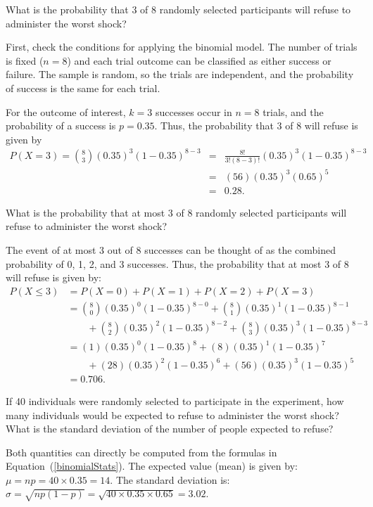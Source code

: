\begin{examplewrap}
\begin{nexample}{What is the probability that 3 of 8 randomly selected participants will refuse to administer the worst shock?}
	
	First, check the conditions for applying the binomial model. The number of trials is fixed ($n=8$) and each trial outcome can be classified as either success or failure. The sample is random, so the trials are independent, and the probability of success is the same for each trial. 
	
	For the outcome of interest, $k=3$ successes occur in $n=8$ trials, and the probability of a success is $p=0.35$. Thus, the probability that 3 of 8 will refuse is given by
	\begin{eqnarray*}
		P(X =3) = { 8 \choose 3}(0.35)^3(1-0.35)^{8-3}
		&=& \frac{8!}{3!(8-3)!}(0.35)^3(1-0.35)^{8-3} \\
		&=& (56)(0.35)^3(0.65)^5 \\
		&=& 0.28.
	\end{eqnarray*}
\end{nexample}
\end{examplewrap}

\begin{examplewrap}
\begin{nexample}{What is the probability that at most 3 of 8 randomly selected participants will refuse to administer the worst shock?}
	
	The event of at most 3 out of 8 successes can be thought of as the combined probability of 0, 1, 2, and 3 successes. Thus, the probability that at most 3 of 8 will refuse is given by:
	\begin{align*}
	P(X \leq 3) &= P(X = 0) + P(X = 1) + P(X = 2) + P(X = 3) \\
	&= { 8 \choose 0}(0.35)^0(1-0.35)^{8-0} + { 8 \choose 1}(0.35)^1(1-0.35)^{8-1} \\
	& \qquad + { 8 \choose 2}(0.35)^2(1-0.35)^{8-2} + { 8 \choose 3}(0.35)^3(1-0.35)^{8-3} \\
	&= (1)(0.35)^0(1-0.35)^{8} + (8)(0.35)^1(1-0.35)^{7} \\
	& \qquad + (28)(0.35)^2(1-0.35)^{6} + (56)(0.35)^3(1-0.35)^{5}\\
	&= 0.706.
	\end{align*}
\end{nexample}
\end{examplewrap}

\begin{examplewrap}
\begin{nexample}{If 40 individuals were randomly selected to participate in the experiment, how many individuals would be expected to refuse to administer the worst shock? What is the standard deviation of the number of people expected to refuse?}
	
	Both quantities can directly be computed from the formulas in Equation~(\ref{binomialStats}). The expected value (mean) is given by: $\mu=np = 40\times 0.35 = 14$. The standard deviation is: $\sigma = \sqrt{np(1-p)} = \sqrt{40\times 0.35\times 0.65} = 3.02$.
\end{nexample}
\end{examplewrap}

